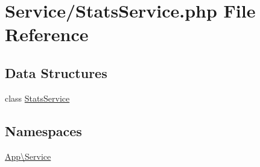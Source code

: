 \hypertarget{_stats_service_8php}{}\section{Service/\+Stats\+Service.php File Reference}
\label{_stats_service_8php}
\subsection*{Data Structures}
\begin{DoxyCompactItemize}
\item 
class \mbox{\hyperlink{class_app_1_1_service_1_1_stats_service}{Stats\+Service}}
\end{DoxyCompactItemize}
\subsection*{Namespaces}
\begin{DoxyCompactItemize}
\item 
 \mbox{\hyperlink{namespace_app_1_1_service}{App\textbackslash{}\+Service}}
\end{DoxyCompactItemize}
